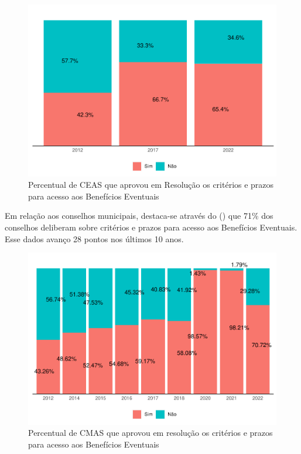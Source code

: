 \documentclass[
  brazilian]{report}
\begin{document}
\begin{figure}
\includegraphics{Censo-SUAS-2022_files/figure-latex/ceas_be-1} \caption[Percentual de CEAS que aprovou em Resolução os critérios e prazos para acesso aos Benefícios Eventuais]{Percentual de CEAS que aprovou em Resolução os critérios e prazos para acesso aos Benefícios Eventuais}\label{fig:ceas_be}
\end{figure}

Em relação aos conselhos municipais, destaca-se através do
() que 71\% dos conselhos deliberam sobre critérios e
prazos para acesso aos Benefícios Eventuais. Esse dados avanço 28 pontos
nos últimos 10 anos.

\begin{figure}
\includegraphics{Censo-SUAS-2022_files/figure-latex/cmas_be-1} \caption[Percentual de CMAS que aprovou em resolução os critérios e prazos para acesso aos Benefícios Eventuais]{Percentual de CMAS que aprovou em resolução os critérios e prazos para acesso aos Benefícios Eventuais}\label{fig:cmas_be}
\end{figure}
\end{document}
